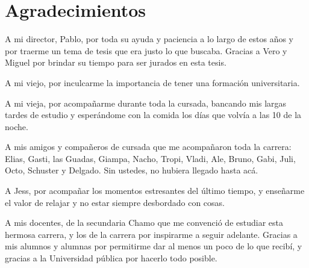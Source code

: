 \chapter*{Agradecimientos}

\noindent 

A mi director, Pablo, por toda su ayuda y paciencia a lo largo de estos años y
por traerme un tema de tesis que era justo lo que buscaba. Gracias a Vero y Miguel por brindar su tiempo para ser jurados en esta tesis.

A mi viejo, por inculcarme la importancia de tener una formación universitaria.

A mi vieja, por acompañarme durante toda la cursada, bancando mis largas tardes
de estudio y esperándome con la comida los días que volvía a las 10 de la noche.

A mis amigos y compañeros de cursada que me acompañaron toda la carrera: Elias,
Gasti, las Guadas, Giampa, Nacho, Tropi, Vladi, Ale, Bruno, Gabi, Juli, Octo,
Schuster y Delgado. Sin ustedes, no hubiera llegado hasta acá.

A Jess, por acompañar los momentos estresantes del último tiempo, y enseñarme el
valor de relajar y no estar siempre desbordado con cosas.

A mis docentes, de la secundaria Chamo que me convenció de estudiar esta
hermosa carrera, y los de la carrera por inspirarme a seguir adelante. Gracias a
mis alumnos y alumnas por permitirme dar al menos un poco de lo que recibí, y
gracias a la Universidad pública por hacerlo todo posible.